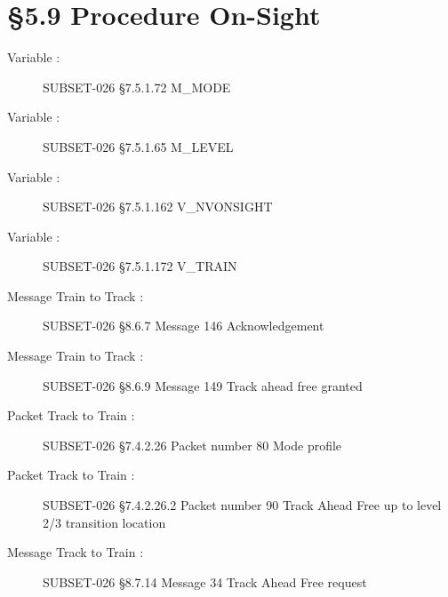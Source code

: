 \documentclass{template/openetcs_report}
\begin{document}
\section{\S5.9 Procedure On-Sight}
\begin{description}
\item [Variable :] SUBSET-026 \S7.5.1.72 M\_MODE
\item [Variable :] SUBSET-026 \S7.5.1.65 M\_LEVEL
\item [Variable :] SUBSET-026 \S7.5.1.162	V\_NVONSIGHT
\item [Variable :] SUBSET-026 \S7.5.1.172	V\_TRAIN
\item [Message Train to Track :] SUBSET-026 \S8.6.7 Message 146 Acknowledgement
\item [Message Train to Track :] SUBSET-026 \S8.6.9 Message 149 Track ahead free granted
\item [Packet Track to Train :] SUBSET-026 \S7.4.2.26 Packet number 80 Mode profile
\item [Packet Track to Train :] SUBSET-026 \S7.4.2.26.2 Packet number 90 Track Ahead Free up to level 2/3 transition location
\item [Message Track to Train :] SUBSET-026 \S8.7.14 Message 34 Track Ahead Free request
\end{description}
\end{document}
